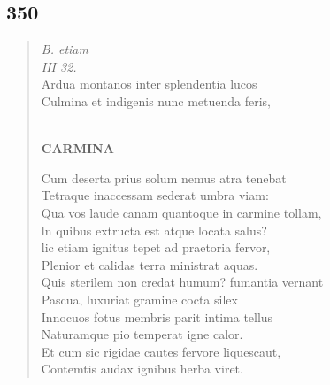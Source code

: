 \documentclass[11pt, a4paper]{report}
\begin{document}
            \subsection*{350}
      \begin{verse}
      \textit{ \lbrack B. etiam} \\ \textit{III 32.} \\ Ardua montanos inter splendentia lucos \\ Culmina et indigenis nunc metuenda feris, \\ 
        ﻿\pagebreak 
    \begin{center} \textbf{CARMINA} \end{center} \marginpar{[276]} Cum deserta prius solum nemus atra tenebat \\ Tetraque inaccessam sederat umbra viam: \\ Qua vos laude canam quantoque in carmine tollam, \\ ln quibus extructa est atque locata salus? \\ lic etiam ignitus tepet ad praetoria fervor, \\ Plenior et calidas terra ministrat aquas. \\  \lbrack Quis sterilem non credat humum? fumantia vernant \\ Pascua, luxuriat gramine cocta silex \rbrack  \\ Innocuos fotus membris parit intima tellus \\ Naturamque pio temperat igne calor. \\  \lbrack Et cum sic rigidae cautes fervore liquescaut, \\ Contemtis audax ignibus herba viret. \rbrack  \\ 
      \end{verse}
  
\end{document}
